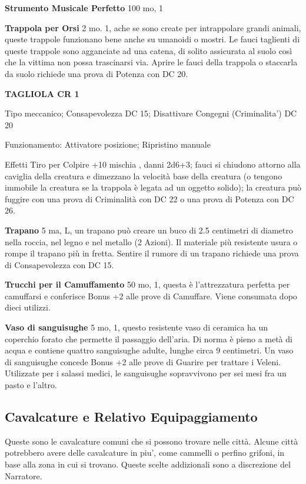 \documentclass[a4paper,11pt,twoside,openany]{book}
\begin{document}
\textbf{Strumento Musicale Perfetto} 100 mo, 1

\textbf{Trappola per Orsi} 2 mo. 1, ache se sono create per intrappolare grandi animali, queste trappole funzionano bene anche su umanoidi o mostri. Le fauci taglienti di queste trappole sono agganciate ad una catena, di solito assicurata al suolo così che la vittima non possa trascinarsi via. Aprire le fauci della trappola o staccarla da suolo richiede una prova di Potenza con DC 20.

\textbf{TAGLIOLA CR 1}

Tipo meccanico; Consapevolezza DC 15; Disattivare Congegni (Criminalita') DC 20

Funzionamento:  Attivatore posizione; Ripristino manuale

Effetti Tiro per Colpire +10 mischia , danni 2d6+3; fauci si chiudono attorno alla caviglia della creatura e dimezzano la velocità base della creatura (o tengono immobile la creatura se la trappola è legata ad un oggetto solido); la creatura può fuggire con una prova di Criminalità con DC 22 o una prova di Potenza con DC 26.

\textbf{Trapano} 5 ma, L, un trapano può creare un buco di 2.5 centimetri di diametro nella roccia, nel legno e nel metallo (2 Azioni). Il materiale più resistente usura o rompe il trapano più in fretta. Sentire il rumore di un trapano richiede una prova di Consapevolezza con DC 15.

\textbf{Trucchi per il Camuffamento} 50 mo, 1, questa è l'attrezzatura perfetta per camuffarsi e conferisce Bonus +2 alle prove di Camuffare. Viene consumata dopo dieci utilizzi.

\textbf{Vaso di sanguisughe} 5 mo, 1, questo resistente vaso di ceramica ha un coperchio forato che permette il passaggio dell'aria. Di norma è pieno a metà di acqua e contiene quattro sanguisughe adulte, lunghe circa 9 centimetri.
Un vaso di sanguisughe concede Bonus +2 alle prove di Guarire per trattare i Veleni. Utilizzate per i salassi medici, le sanguisughe sopravvivono per sei mesi fra un pasto e l'altro.

\pagebreak

\subsection{Cavalcature e Relativo Equipaggiamento}

\label{cavalcature-e-relativo-equipaggiamento}

Queste sono le cavalcature comuni che si possono trovare nelle città. Alcune città potrebbero avere delle cavalcature in piu', come cammelli o perfino grifoni, in base alla zona in cui si trovano. Queste scelte addizionali sono a discrezione del Narratore.
\end{document}
